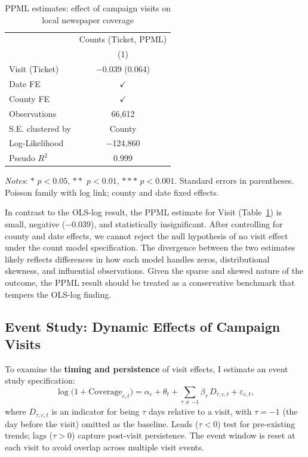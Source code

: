 \documentclass{article}
\begin{document}
\begin{table}[htbp]
\centering
\caption{PPML estimates: effect of campaign visits on local newspaper coverage}
\label{tab:ppml}
\renewcommand\cellalign{t}
\begin{threeparttable}
\begin{tabular}{lc}
\toprule
 & \multicolumn{1}{c}{Counts (Ticket, PPML)} \\
\cmidrule(lr){2-2}
 & (1) \\
\midrule
\addlinespace
Visit (Ticket) & \makecell{$-$0.039 \\ (0.064)} \\
\midrule
\addlinespace
Date FE        & $\checkmark$ \\
County FE      & $\checkmark$ \\
\midrule
\addlinespace
Observations     & 66,612 \\
S.E. clustered by & County \\
Log-Likelihood   & $-$124,860 \\
Pseudo $R^2$     & 0.999 \\
\bottomrule
\end{tabular}
\begin{tablenotes}
\footnotesize
\item \textit{Notes}: $*$ $p<0.05$, $**$ $p<0.01$, $***$ $p<0.001$.
      Standard errors in parentheses.
      Poisson family with log link; county and date fixed effects.
\end{tablenotes}
\end{threeparttable}
\end{table}

In contrast to the OLS-log result, the PPML estimate for Visit (Table~\ref{tab:ppml}) is
small, negative ($-0.039$), and statistically insignificant.
After controlling for county and date effects, we cannot reject the null hypothesis of no
visit effect under the count model specification.
The divergence between the two estimates likely reflects differences in how each model
handles zeros, distributional skewness, and influential observations.
Given the sparse and skewed nature of the outcome, the PPML result should be treated as a
conservative benchmark that tempers the OLS-log finding.


\subsection*{Event Study: Dynamic Effects of Campaign Visits}

To examine the \textbf{timing and persistence} of visit effects, I estimate an event study
specification:
\begin{equation}
\log\!\big(1+\text{Coverage}_{c,t}\big)
= \alpha_c + \theta_t + \sum_{\tau \neq -1} \beta_\tau \, D_{\tau,c,t} + \varepsilon_{c,t},
\label{eq:eventstudy}
\end{equation}
where $D_{\tau,c,t}$ is an indicator for being $\tau$ days relative to a visit, with
$\tau = -1$ (the day before the visit) omitted as the baseline.
Leads ($\tau < 0$) test for pre-existing trends; lags ($\tau > 0$) capture post-visit
persistence.
The event window is reset at each visit to avoid overlap across multiple visit events.
\end{document}
